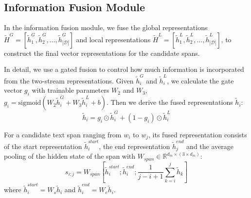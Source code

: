 \subsection{Information Fusion Module}

In the information fusion module, we fuse the global representations $\widetilde{H}^G = \left [\widetilde{h}_1^G, \widetilde{h}_2^G, \dots, \widetilde{h}^G_{\left | \mathcal{D} \right | } \right ]$ and local representations $\widetilde{H}^L = \left [\widetilde{h}_1^L, \widetilde{h}_2^L, \dots, \widetilde{h}^L_{\left | \mathcal{D} \right | } \right ]$, to construct the final vector representations for the candidate spans.

In detail, we use a gated fusion to control how much information is incorporated from the two-stream representations.
Given $\widetilde{h}_i^G$ and $\widetilde{h}_i^L$, we calculate the gate vector $g_i$ with trainable parameters $W_2$ and $W_3$, $g_i = \mathrm{sigmoid}(W_2\widetilde{h}_i^G+W_3\widetilde{h}_i^L+b)$.
Then we derive the fused representations $\widetilde{h}_i$:
\begin{equation*}
    \widetilde{h}_i =  g_i \odot \widetilde{h}_i^G+(1-g_i) \odot \widetilde{h}_i^L
\end{equation*}

For a candidate text span ranging from $w_i$ to $w_j$, its fused representation consists of the start representation $\widetilde{h}_{i}^{start}$, the end representation $\widetilde{h}_{j}^{end}$ and the average pooling of the hidden state of the span with $W_{span} \in \mathbb{R}^{ d_m \times (3 \times d_m)}$:
\begin{equation*}
s_{i:j} = W_{span}\left [ \widetilde{h}_i^{start};\widetilde{h}_i^{end}; \frac{1}{j-i+1} \sum_{k=i}^{j} \widetilde{h}_k \right ]
\end{equation*}
where $\widetilde{h}_{i}^{start} = W_{s}\widetilde{h}_i$ and $\widetilde{h}_{i}^{end} = W_{e}\widetilde{h}_i$.

